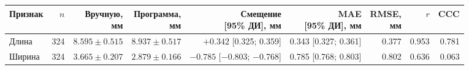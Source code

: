 \begin{tabular}{@{}lrrrrrrrr@{}}
\toprule
Признак & $n$ & \shortstack{Вручную,\\мм} & \shortstack{Программа,\\мм} &
\shortstack{Смещение\\{[95\% ДИ], мм}} &
\shortstack{MAE\\{[95\% ДИ], мм}} & \shortstack{RMSE,\\мм} & $r$ & CCC \\
\midrule
Длина & 324 & $\num{8.595} \pm \num{0.515}$ & $\num{8.937} \pm \num{0.517}$ & $+\num{0.342}$ [\num{0.325}; \num{0.359}] & \num{0.343} [\num{0.327}; \num{0.361}] & \num{0.377} & \num{0.953} & \num{0.781} \\
Ширина & 324 & $\num{3.665} \pm \num{0.207}$ & $\num{2.879} \pm \num{0.166}$ & $-\num{0.785}$ [\num{-0.803}; \num{-0.768}] & \num{0.785} [\num{0.768}; \num{0.803}] & \num{0.802} & \num{0.636} & \num{0.063} \\
\bottomrule
\end{tabular}
